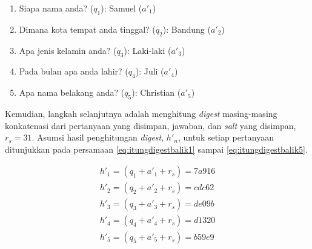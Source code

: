 \begin{enumerate}
	\item Siapa nama anda? (\begin{math}q_1\end{math}): Samuel (\begin{math}a'_1\end{math})
	\item Dimana kota tempat anda tinggal? (\begin{math}q_2\end{math}): Bandung (\begin{math}a'_2\end{math})
	\item Apa jenis kelamin anda? (\begin{math}q_3\end{math}): Laki-laki (\begin{math}a'_3\end{math})
	\item Pada bulan apa anda lahir? (\begin{math}q_4\end{math}): Juli (\begin{math}a'_4\end{math})
	\item Apa nama belakang anda? (\begin{math}q_5\end{math}): Christian (\begin{math}a'_5\end{math})
\end{enumerate}

Kemudian, langkah selanjutnya adalah menghitung \textit{digest} masing-masing konkatenasi dari pertanyaan yang disimpan, jawaban, dan \textit{salt} yang disimpan, \begin{math}r_s=31\end{math}. Asumsi hasil penghitungan \textit{digest}, \begin{math}h'_n\end{math}, untuk setiap pertanyaan ditunjukkan pada persamaan \ref{eq:itungdigestbalik1} sampai \ref{eq:itungdigestbalik5}.

\begin{gather}
	h'_1 = (q_1 + a'_1 + r_s) = 7a916 \label{eq:itungdigestbalik1} \\
	h'_2 = (q_2 + a'_2 + r_s) = cdc62 \label{eq:itungdigestbalik2} \\
	h'_3 = (q_3 + a'_3 + r_s) = de09b \label{eq:itungdigestbalik3} \\
	h'_4 = (q_4 + a'_4 + r_s) = d1320 \label{eq:itungdigestbalik4} \\
	h'_5 = (q_5 + a'_5 + r_s) = b59e9 \label{eq:itungdigestbalik5}
\end{gather}

